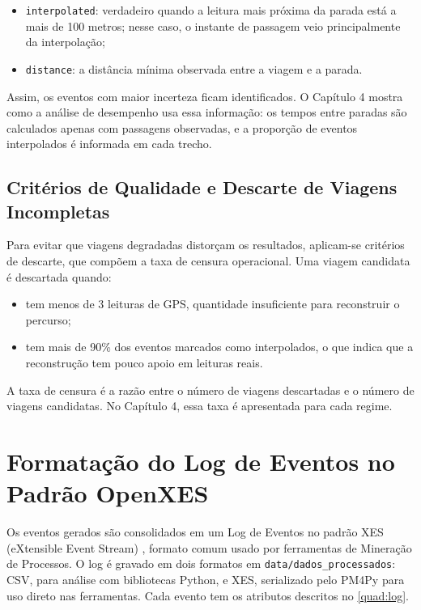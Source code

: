 \begin{itemize}
  \item \texttt{interpolated}: verdadeiro quando a leitura mais próxima da parada está a mais de 100 metros; nesse caso, o instante de passagem veio principalmente da interpolação;
  \item \texttt{distance}: a distância mínima observada entre a viagem e a parada.
\end{itemize}

Assim, os eventos com maior incerteza ficam identificados. O Capítulo 4 mostra como a análise de desempenho usa essa informação: os tempos entre paradas são calculados apenas com passagens observadas, e a proporção de eventos interpolados é informada em cada trecho.

\subsection{Critérios de Qualidade e Descarte de Viagens Incompletas}\label{subsec:qualidadeViagens}

Para evitar que viagens degradadas distorçam os resultados, aplicam-se critérios de descarte, que compõem a taxa de censura operacional. Uma viagem candidata é descartada quando:

\begin{itemize}
  \item tem menos de 3 leituras de GPS, quantidade insuficiente para reconstruir o percurso;
  \item tem mais de 90\% dos eventos marcados como interpolados, o que indica que a reconstrução tem pouco apoio em leituras reais.
\end{itemize}

A taxa de censura é a razão entre o número de viagens descartadas e o número de viagens candidatas. No Capítulo 4, essa taxa é apresentada para cada regime.
\section{Formatação do Log de Eventos no Padrão OpenXES}\label{sec:openxes}

Os eventos gerados são consolidados em um Log de Eventos no padrão XES (eXtensible Event Stream) \cite{ieee1849}, formato comum usado por ferramentas de Mineração de Processos. O log é gravado em dois formatos em \texttt{data/dados\_processados}: CSV, para análise com bibliotecas Python, e XES, serializado pelo PM4Py para uso direto nas ferramentas. Cada evento tem os atributos descritos no \autoref{quad:log}.


